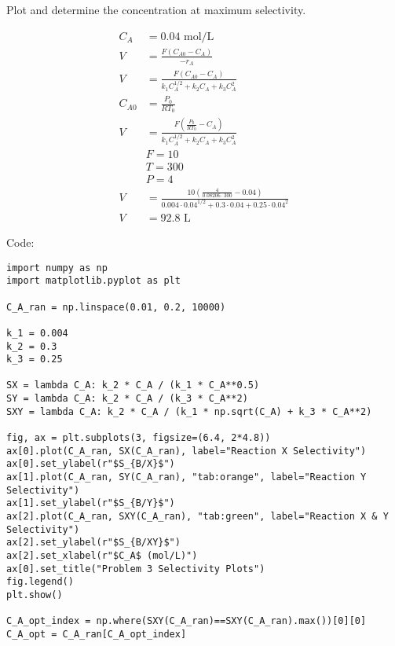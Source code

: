 \documentclass[12pt]{article}
\begin{document}
\begin{enumerate}
    Plot and determine the concentration at maximum selectivity.

    \begin{center}
        
    \end{center}

    \begin{align*}
        C_A &= 0.04 \text{ mol/L} \\
        V &= \frac{F \left(C_{A0} - C_A\right)}{-r_A} \\
        V &= \frac{F \left(C_{A0} - C_A\right)}{k_1 C_A^{1/2} + k_2 C_A + k_3 C_A^2} \\
        C_{A0} &= \frac{P_0}{R T_0} \\
        V &= \frac{F \left(\frac{P_0}{R T_0} - C_A\right)}{k_1 C_A^{1/2} + k_2 C_A + k_3 C_A^2} \\
        & F = 10 \\
        & T = 300 \\
        & P = 4 \\
        V &= \frac{10 \left(\frac{4}{0.08206 \cdot 300} - 0.04\right)}{0.004 \cdot 0.04^{1/2} + 0.3 \cdot 0.04 + 0.25 \cdot 0.04^2} \\
        V &= 92.8 \text{ L}
    \end{align*}

    Code:

\begin{verbatim}
import numpy as np
import matplotlib.pyplot as plt

C_A_ran = np.linspace(0.01, 0.2, 10000)

k_1 = 0.004
k_2 = 0.3
k_3 = 0.25

SX = lambda C_A: k_2 * C_A / (k_1 * C_A**0.5)
SY = lambda C_A: k_2 * C_A / (k_3 * C_A**2)
SXY = lambda C_A: k_2 * C_A / (k_1 * np.sqrt(C_A) + k_3 * C_A**2)

fig, ax = plt.subplots(3, figsize=(6.4, 2*4.8))
ax[0].plot(C_A_ran, SX(C_A_ran), label="Reaction X Selectivity")
ax[0].set_ylabel(r"$S_{B/X}$")
ax[1].plot(C_A_ran, SY(C_A_ran), "tab:orange", label="Reaction Y Selectivity")
ax[1].set_ylabel(r"$S_{B/Y}$")
ax[2].plot(C_A_ran, SXY(C_A_ran), "tab:green", label="Reaction X & Y Selectivity")
ax[2].set_ylabel(r"$S_{B/XY}$")
ax[2].set_xlabel(r"$C_A$ (mol/L)")
ax[0].set_title("Problem 3 Selectivity Plots")
fig.legend()
plt.show()

C_A_opt_index = np.where(SXY(C_A_ran)==SXY(C_A_ran).max())[0][0]
C_A_opt = C_A_ran[C_A_opt_index]


\end{verbatim}
\end{enumerate}
\end{document}
